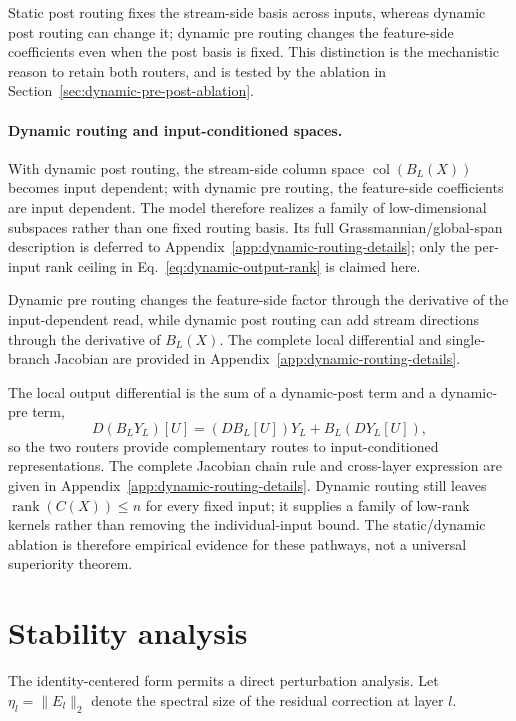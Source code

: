 \documentclass{article}
\newcommand{\norm}[1]{\lVert #1\rVert}
\begin{document}
Static post routing fixes the stream-side basis across inputs, whereas dynamic
post routing can change it; dynamic pre routing changes the feature-side
coefficients even when the post basis is fixed. This distinction is the
mechanistic reason to retain both routers, and is tested by the ablation in
Section~\ref{sec:dynamic-pre-post-ablation}.

\paragraph{Dynamic routing and input-conditioned spaces.}
With dynamic post routing, the stream-side column space $\operatorname{col}(B_L(X))$
becomes input dependent; with dynamic pre routing, the feature-side coefficients
are input dependent. The model therefore realizes a family of low-dimensional
subspaces rather than one fixed routing basis. Its full Grassmannian/global-span
description is deferred to Appendix~\ref{app:dynamic-routing-details}; only the
per-input rank ceiling in Eq.~\ref{eq:dynamic-output-rank} is claimed here.

Dynamic pre routing changes the feature-side factor through the derivative of
the input-dependent read, while dynamic post routing can add stream directions
through the derivative of $B_L(X)$. The complete local differential and
single-branch Jacobian are provided in Appendix~\ref{app:dynamic-routing-details}.

The local output differential is the sum of a dynamic-post term and a
dynamic-pre term,
\begin{equation}
 D\!\left(B_LY_L\right)[U]
 =\left(DB_L[U]\right)Y_L+B_L\left(DY_L[U]\right),
 \label{eq:dynamic-factor-summary}
\end{equation}
so the two routers provide complementary routes to input-conditioned
representations. The complete Jacobian chain rule and cross-layer expression
are given in Appendix~\ref{app:dynamic-routing-details}. Dynamic routing still
leaves $\operatorname{rank}(C(X))\leq n$ for every fixed input; it supplies a
family of low-rank kernels rather than removing the individual-input bound.
The static/dynamic ablation is therefore empirical evidence for these pathways,
not a universal superiority theorem.


\section{Stability analysis}

The identity-centered form permits a direct perturbation analysis. Let $\eta_l=\norm{E_l}_2$ denote the spectral size of the residual correction at layer $l$.
\end{document}
